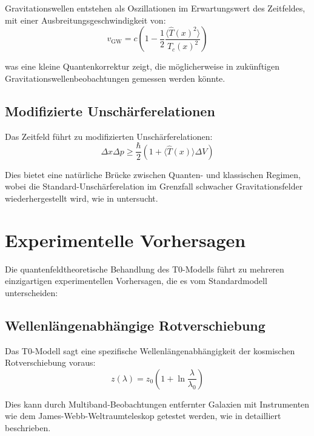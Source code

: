 \documentclass[12pt,a4paper]{article}
\begin{document}
	Gravitationswellen entstehen als Oszillationen im Erwartungswert des Zeitfeldes, mit einer Ausbreitungsgeschwindigkeit von:
	\begin{equation}
		v_{\text{GW}} = c\left(1 - \frac{1}{2}\frac{\langle \hat{T}(x)^2 \rangle}{T_c(x)^2}\right)
		\label{eq:gw_speed}
	\end{equation}
	
	was eine kleine Quantenkorrektur zeigt, die möglicherweise in zukünftigen Gravitationswellenbeobachtungen gemessen werden könnte.
	
	\subsection{Modifizierte Unschärferelationen}
	\label{subsec:uncertainty}
	
	Das Zeitfeld führt zu modifizierten Unschärferelationen:
	\begin{equation}
		\Delta x \Delta p \geq \frac{\hbar}{2}\left(1 + \langle \hat{T}(x) \rangle \Delta V\right)
		\label{eq:uncertainty}
	\end{equation}
	
	Dies bietet eine natürliche Brücke zwischen Quanten- und klassischen Regimen, wobei die Standard-Unschärferelation im Grenzfall schwacher Gravitationsfelder wiederhergestellt wird, wie in \cite{Pascher2025Extensions} untersucht.
	
	\section{Experimentelle Vorhersagen}
	\label{sec:predictions}
	
	Die quantenfeldtheoretische Behandlung des T0-Modells führt zu mehreren einzigartigen experimentellen Vorhersagen, die es vom Standardmodell unterscheiden:
	
	\subsection{Wellenlängenabhängige Rotverschiebung}
	\label{subsec:redshift_prediction}
	
	Das T0-Modell sagt eine spezifische Wellenlängenabhängigkeit der kosmischen Rotverschiebung voraus:
	\begin{equation}
		z(\lambda) = z_0\left(1 + \ln\frac{\lambda}{\lambda_0}\right)
		\label{eq:redshift_prediction}
	\end{equation}
	
	Dies kann durch Multiband-Beobachtungen entfernter Galaxien mit Instrumenten wie dem James-Webb-Weltraumteleskop getestet werden, wie in \cite{Pascher2025Measurements} detailliert beschrieben.
	
\end{document}
